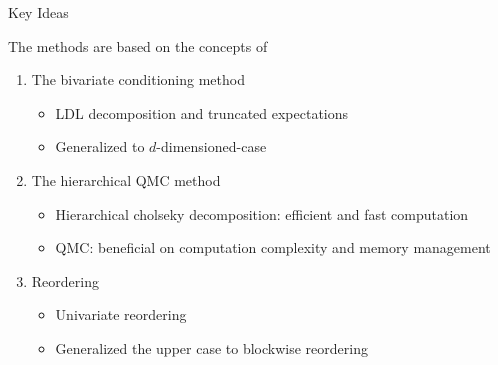 \begin{frame}{Key Ideas}
    
    The methods are based on the concepts of 
        \begin{enumerate}
            \item The bivariate conditioning method \citep{trinh2015bivariate}
            \begin{itemize}
                \item LDL decomposition and truncated expectations
                \item Generalized to $d$-dimensioned-case
            \end{itemize}
            \item The hierarchical QMC method \citep{genton2018hierarchical}
            \begin{itemize}
                \item Hierarchical cholseky decomposition: efficient and fast computation
                \item QMC: beneficial on computation complexity and memory management
            \end{itemize}
            \item Reordering \citep{trinh2015bivariate}
            \begin{itemize}
                \item Univariate reordering \citep{trinh2015bivariate}
                \item Generalized the upper case to blockwise reordering
            \end{itemize}
        \end{enumerate} 
        
        
\end{frame}
